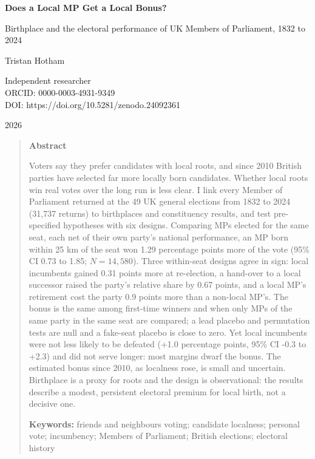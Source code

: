 \documentclass[11pt,a4paper]{article}
\begin{document}
\begin{center}
{\LARGE\bfseries Does a Local MP Get a Local Bonus?\par}
\vspace{0.4em}
{\large Birthplace and the electoral performance of UK Members of Parliament, 1832 to 2024\par}
\vspace{1.2em}
{\large Tristan Hotham\par}
\vspace{0.3em}
{\small Independent researcher\\
ORCID: 0000-0003-4931-9349\\
DOI: https://doi.org/10.5281/zenodo.24092361\par}
\vspace{0.8em}
2026
\end{center}

\begin{quote}
\small
\begin{center}\textbf{Abstract}\end{center}
Voters say they prefer candidates with local roots, and since 2010 British parties have selected far more locally born candidates. Whether local roots win real votes over the long run is less clear. I link every Member of Parliament returned at the 49 UK general elections from 1832 to 2024 (31{,}737 returns) to birthplaces and constituency results, and test pre-specified hypotheses with six designs. Comparing MPs elected for the same seat, each net of their own party's national performance, an MP born within 25 km of the seat won 1.29 percentage points more of the vote (95\% CI 0.73 to 1.85; $N=14{,}580$). Three within-seat designs agree in sign: local incumbents gained 0.31 points more at re-election, a hand-over to a local successor raised the party's relative share by 0.67 points, and a local MP's retirement cost the party 0.9 points more than a non-local MP's. The bonus is the same among first-time winners and when only MPs of the same party in the same seat are compared; a lead placebo and permutation tests are null and a fake-seat placebo is close to zero. Yet local incumbents were not less likely to be defeated (+1.0 percentage points, 95\% CI -0.3 to +2.3) and did not serve longer: most margins dwarf the bonus. The estimated bonus since 2010, as localness rose, is small and uncertain. Birthplace is a proxy for roots and the design is observational: the results describe a modest, persistent electoral premium for local birth, not a decisive one.

\textbf{Keywords:} friends and neighbours voting; candidate localness; personal vote; incumbency; Members of Parliament; British elections; electoral history
\end{quote}
\end{document}
